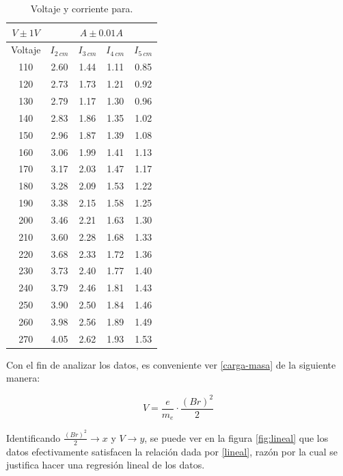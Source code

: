\documentclass[prb,aps,twocolumn,preprintnumbers,amsmath,amssymb]{revtex4}
\begin{document}
\begin{table}[h!]
	\caption{\label{Tabla 1}Voltaje y corriente para.}
	\begin{ruledtabular}
		\begin{tabular}{ccccc}
			\multicolumn{1}{c}{$V \pm 1V$} & \multicolumn{4}{c}{$A \pm 0.01A$ } \\
			\hline
			Voltaje &$I_{2\ cm}$&$I_{3\ cm}$&$I_{4\ cm}$&$I_{5\ cm}$\\
			\hline
			110 & 2.60 & 1.44 & 1.11 & 0.85 \\
			120 & 2.73 & 1.73 & 1.21 & 0.92\\
			130 & 2.79 & 1.17 & 1.30 & 0.96\\
			140 & 2.83 & 1.86 & 1.35 & 1.02\\
			150 & 2.96 & 1.87 & 1.39 & 1.08\\
			160 & 3.06 & 1.99 & 1.41 & 1.13\\
			170 & 3.17 & 2.03 & 1.47 & 1.17\\
			180 & 3.28 & 2.09 & 1.53 & 1.22\\
			190 & 3.38 & 2.15 & 1.58 & 1.25\\
			200 & 3.46 & 2.21 & 1.63 & 1.30\\
			210 & 3.60 & 2.28 & 1.68 & 1.33\\
			220 & 3.68 & 2.33 & 1.72 & 1.36\\
			230 & 3.73 & 2.40 & 1.77 & 1.40\\
			240 & 3.79 & 2.46 & 1.81 & 1.43\\
			250 & 3.90 & 2.50 & 1.84 & 1.46\\
			260 & 3.98 & 2.56 & 1.89 & 1.49\\
			270 & 4.05 & 2.62 & 1.93 & 1.53\\
		\end{tabular}
	\end{ruledtabular}
\end{table}

Con el fin de analizar los datos, es conveniente ver \eqref{carga-masa} de la siguiente manera:

\begin{equation}
V = \frac{e}{m_{e}}\cdot\frac{(Br)^2}{2} 
\label{lineal}
\end{equation}

Identificando $\frac{(Br)^2}{2} \rightarrow x$ y $V \rightarrow y$, se puede ver en la figura \ref{fig:lineal} que los datos efectivamente satisfacen la relación dada por \eqref{lineal}, razón por la cual se justifica hacer una regresión lineal de los datos.\\
\end{document}
